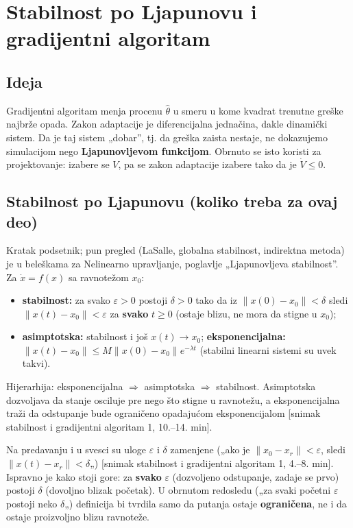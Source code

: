 \documentclass[11pt,a4paper,parskip=half,headsepline,numbers=noenddot]{scrartcl}
\DeclareRobustCommand{\izvor}[1]{{\small\color{izvorC}[#1]}}
\begin{document}
\section{Stabilnost po Ljapunovu i gradijentni algoritam}

\subsection{Ideja}

Gradijentni algoritam menja procenu \(\hat\theta\) u smeru u kome kvadrat trenutne greške najbrže opada. Zakon adaptacije je diferencijalna jednačina, dakle dinamički sistem. Da je taj sistem „dobar'', tj. da greška zaista nestaje, ne dokazujemo simulacijom nego \textbf{Ljapunovljevom funkcijom}. Obrnuto se isto koristi za projektovanje: izabere se \(V\), pa se zakon adaptacije izabere tako da je \(\dot V \le 0\).

\subsection{Stabilnost po Ljapunovu (koliko treba za ovaj deo)}

Kratak podsetnik; pun pregled (LaSalle, globalna stabilnost, indirektna metoda) je u beleškama za Nelinearno upravljanje, poglavlje „Ljapunovljeva stabilnost''. Za \(\dot x = f(x)\) sa ravnotežom \(x_0\):

\begin{itemize}
\item \textbf{stabilnost:} za svako \(\varepsilon > 0\) postoji \(\delta > 0\) tako da iz \(\|x(0) - x_0\| < \delta\) sledi \(\|x(t) - x_0\| < \varepsilon\) za \textbf{svako} \(t \ge 0\) (ostaje blizu, ne mora da stigne u \(x_0\));
\item \textbf{asimptotska:} stabilnost i još \(x(t) \to x_0\); \textbf{eksponencijalna:} \(\|x(t) - x_0\| \le M\|x(0) - x_0\|e^{-\lambda t}\) (stabilni linearni sistemi su uvek takvi).
\end{itemize}

Hijerarhija: eksponencijalna \(\Rightarrow\) asimptotska \(\Rightarrow\) stabilnost. Asimptotska dozvoljava da stanje osciluje pre nego što stigne u ravnotežu, a eksponencijalna traži da odstupanje bude ograničeno opadajućom eksponencijalom \izvor{snimak stabilnost i gradijentni algoritam 1, 10.--14. min}.

Na predavanju i u svesci su uloge \(\varepsilon\) i \(\delta\) zamenjene („ako je \(\|x_0 - x_r\| < \varepsilon\), sledi \(\|x(t) - x_r\| < \delta\)„) \izvor{snimak stabilnost i gradijentni algoritam 1, 4.--8. min}. Ispravno je kako stoji gore: za \textbf{svako} \(\varepsilon\) (dozvoljeno odstupanje, zadaje se prvo) postoji \(\delta\) (dovoljno blizak početak). U obrnutom redosledu („za svaki početni \(\varepsilon\) postoji neko \(\delta\)„) definicija bi tvrdila samo da putanja ostaje \textbf{ograničena}, ne i da ostaje proizvoljno blizu ravnoteže.
\end{document}
